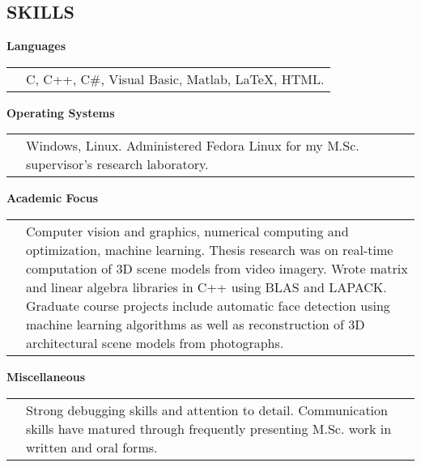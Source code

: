 \documentclass{res}
\begin{document}
\begin{resume}
\section{SKILLS}
    \textbf{Languages}\\
    \begin{tabular}{ l L{5.5in} }
    \hspace*{1.2em} & C, C++, C\#, Visual Basic, Matlab, LaTeX, HTML. \\
    \end{tabular}

    \textbf{Operating Systems}\\
    \begin{tabular}{ l L{5.5in} }
    \hspace*{1.2em} & Windows, Linux.  Administered Fedora Linux for my M.Sc. supervisor's research laboratory.\\
    \end{tabular}

    \textbf{Academic Focus}\vspace{0.5ex}\\
    \begin{tabular}{ l L{5.5in} }
    \hspace*{1.2em} & Computer vision and graphics, numerical computing and optimization, machine learning.  Thesis research was on real-time computation of 3D scene models from video imagery.  Wrote matrix and linear algebra libraries in C++ using BLAS and LAPACK.  Graduate course projects include automatic face detection using machine learning algorithms as well as reconstruction of 3D architectural scene models from photographs.\\
    \end{tabular}

    \textbf{Miscellaneous}\vspace{0.5ex}\\
    \begin{tabular}{ l L{5.5in} }
    \hspace*{1.2em} & Strong debugging skills and attention to detail.  Communication skills have matured through frequently presenting M.Sc. work in written and oral forms.\\
    \end{tabular}



\end{resume}
\end{document}
